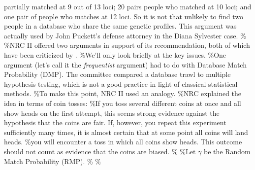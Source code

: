 \documentclass[10pt,dvipsnames,enabledeprecatedfontcommands]{scrartcl}
\begin{document}
partially matched at 9 out of 13 loci; 20 pairs people who matched at 10
loci; and one pair of people who matches at 12 loci. So it is not that
unlikely to find two people in a database who share the same genetic
profiles. This argument was actually used by John Puckett's defense
attorney in the Diana Sylvester case. \% \%NRC II offered two arguments
in support of its recommendation, both of which have been criticized by
\citet{donnelly1999DNADatabaseSearches}. \%We'll only look briefly at
the key issues. \%One argument (let's call it the \emph{frequentist}
argument) had to do with Database Match Probability (DMP). The committee
compared a database trawl to multiple hypothesis testing, which is not a
good practice in light of classical statistical methods. \%To make this
point, NRC II used an analogy. \%NRC explained the idea in terms of coin
tosses: \%If you toss several different coins at once and all show heads
on the first attempt, this seems strong evidence against the hypothesis
that the coins are fair. If, however, you repeat this experiment
sufficiently many times, it is almost certain that at some point all
coins will land heads. \%you will encounter a toss in which all coins
show heads. This outcome should not count as evidence that the coins are
biased. \% \%Let \(\gamma\) be the Random Match Probability (RMP). \% \%
\end{document}
